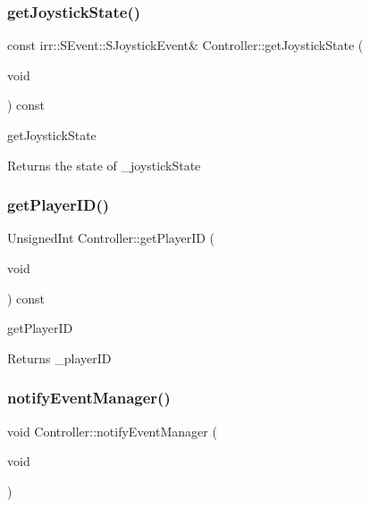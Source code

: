 \subsubsection{\texorpdfstring{get\+Joystick\+State()}{getJoystickState()}}
{\footnotesize\ttfamily const irr\+::\+S\+Event\+::\+S\+Joystick\+Event\& Controller\+::get\+Joystick\+State (\begin{DoxyParamCaption}\item[{void}]{ }\end{DoxyParamCaption}) const}



get\+Joystick\+State 

\begin{DoxyReturn}{Returns}
the state of \+\_\+joystick\+State 
\end{DoxyReturn}
\mbox{\label{classController_a76891bd0871480c92f45c597c3eddf93}} 
\subsubsection{\texorpdfstring{get\+Player\+I\+D()}{getPlayerID()}}
{\footnotesize\ttfamily Unsigned\+Int Controller\+::get\+Player\+ID (\begin{DoxyParamCaption}\item[{void}]{ }\end{DoxyParamCaption}) const}



get\+Player\+ID 

\begin{DoxyReturn}{Returns}
\+\_\+player\+ID 
\end{DoxyReturn}
\mbox{\label{classController_a3e855bf7e018e2659ecb3d0e13a7f39c}} 
\subsubsection{\texorpdfstring{notify\+Event\+Manager()}{notifyEventManager()}}
{\footnotesize\ttfamily void Controller\+::notify\+Event\+Manager (\begin{DoxyParamCaption}\item[{void}]{ }\end{DoxyParamCaption})}



